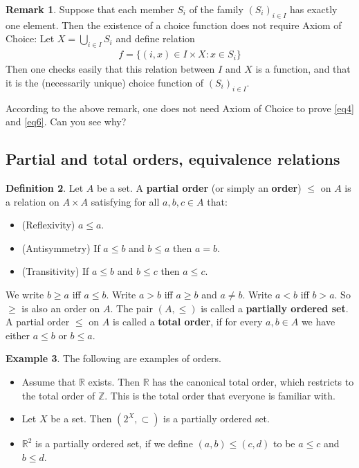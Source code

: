 \documentclass[12pt,b5paper,notitlepage]{article}
\theoremstyle{definition}
\newtheorem{df}{Definition}[section]
\newtheorem{eg}[df]{Example}
\newtheorem{rem}[df]{Remark}
\theoremstyle{plain}
\newcommand{\Zbb}{\mathbb Z}
\newcommand{\Rbb}{\mathbb R}
\numberwithin{equation}{section}
\begin{document}
\begin{rem}
Suppose that each member $S_i$ of the family $(S_i)_{i\in I}$ has exactly one element. Then the existence of a choice function does not require Axiom of Choice: Let $X=\bigcup_{i\in I}S_i$ and define relation
\begin{align*}
f=\{(i,x)\in I\times X: x\in S_i\}
\end{align*}
Then one checks easily that this relation between $I$ and $X$ is a function, and that it is the (necessarily unique) choice function of $(S_i)_{i\in I}$.
\end{rem}

According to the above remark, one does not need Axiom of Choice to prove \eqref{eq4} and \eqref{eq6}. Can you see why?


\subsection{Partial and total orders, equivalence relations}

\begin{df}
Let $A$ be a set. A \textbf{partial order} (or simply an \textbf{order}) $\leq$ on $A$ is a relation on $A\times A$ satisfying for all $a,b,c\in A$ that:
\begin{itemize}
\item (Reflexivity) $a\leq a$.
\item (Antisymmetry) If $a\leq b$ and $b\leq a$ then $a=b$.
\item (Transitivity) If $a\leq b$ and $b\leq c$ then $a\leq c$.
\end{itemize}
We write $b\geq a$ iff $a\leq b$. Write $a>b$ iff $a\geq b$ and $a\neq b$. Write $a<b$ iff $b>a$. So $\geq$ is also an order on $A$. The pair $(A,\leq)$ is called a \textbf{partially ordered set}. A partial order $\leq$ on $A$ is called a \textbf{total order}, if for every $a,b\in A$ we have either $a\leq b$ or $b\leq a$.
\end{df}


\begin{eg}
The following are examples of orders.
\begin{itemize}
\item Assume that $\Rbb$ exists. Then $\Rbb$ has the canonical total order, which restricts to the total order of $\Zbb$. This is the total order that everyone is familiar with.
\item Let $X$ be a set. Then $(2^X,\subset)$ is a partially ordered set.
\item $\Rbb^2$ is a partially ordered set, if we define $(a,b)\leq (c,d)$ to be $a\leq c$ and $b\leq d$. 
\end{itemize}
\end{eg}
\end{document}
